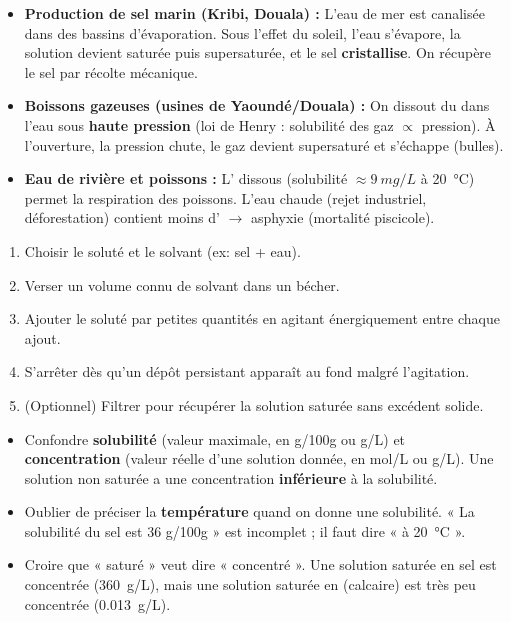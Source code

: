 \documentclass[11pt]{article}
\begin{document}
\begin{exemplebox}
\begin{itemize}
\item \textbf{Production de sel marin (Kribi, Douala) :} L'eau de mer est canalisée dans des bassins d'évaporation. Sous l'effet du soleil, l'eau s'évapore, la solution devient saturée puis supersaturée, et le sel \textbf{cristallise}. On récupère le sel par récolte mécanique.
\item \textbf{Boissons gazeuses (usines de Yaoundé/Douala) :} On dissout du  dans l'eau sous \textbf{haute pression} (loi de Henry : solubilité des gaz $\propto$ pression). À l'ouverture, la pression chute, le gaz devient supersaturé et s'échappe (bulles).
\item \textbf{Eau de rivière et poissons :} L' dissous (solubilité $\approx \SI{9}{mg/L}$ à \SI{20}{\celsius}) permet la respiration des poissons. L'eau chaude (rejet industriel, déforestation) contient moins d' $\rightarrow$ asphyxie (mortalité piscicole).
\end{itemize}
\end{exemplebox}

\begin{methode}
\begin{enumerate}
\item Choisir le soluté et le solvant (ex: sel + eau).
\item Verser un volume connu de solvant dans un bécher.
\item Ajouter le soluté par petites quantités en agitant énergiquement entre chaque ajout.
\item S'arrêter dès qu'un dépôt persistant apparaît au fond malgré l'agitation.
\item (Optionnel) Filtrer pour récupérer la solution saturée sans excédent solide.
\end{enumerate}
\end{methode}

\begin{attention}
\begin{itemize}
\item Confondre \textbf{solubilité} (valeur maximale, en g/100g ou g/L) et \textbf{concentration} (valeur réelle d'une solution donnée, en mol/L ou g/L). Une solution non saturée a une concentration \textbf{inférieure} à la solubilité.
\item Oublier de préciser la \textbf{température} quand on donne une solubilité. « La solubilité du sel est 36 g/100g » est incomplet ; il faut dire « à \SI{20}{\celsius} ».
\item Croire que « saturé » veut dire « concentré ». Une solution saturée en sel est concentrée (\SI{360}{g/L}), mais une solution saturée en  (calcaire) est très peu concentrée (\SI{0.013}{g/L}).
\end{itemize}
\end{attention}
\end{document}
